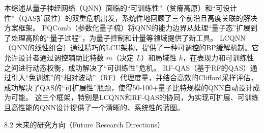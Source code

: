 \documentclass[12pt,a4paper]{article}
\begin{document}
本综述从量子神经网络（QNN）面临的“可训练性”（贫瘠高原）和“可设计性”（QAS扩展性）的双重危机出发，系统性地回顾了三个前沿且高度关联的解决方案框架。
PQComb（参数化量子梳）将QNN的能力边界从处理“量子态”扩展到了处理高阶的“量子过程”，为量子控制和计量等领域提供了新工具。
LCQNN（QNN的线性组合）通过精巧的LCU架构，提供了一种可调控的BP缓解机制。它允许设计者通过调控辅助比特数 $m$（决定 $L$）和局域性 $k$，在表现力和可训练性之间进行动态权衡，成功解决了“可训练性”危机。
RF-QAS（基于RF的QAS）通过引入“免训练”的“相对波动”（RF）代理度量，并结合高效的Clifford采样评估，成功解决了QAS的“可扩展性”瓶颈，使得50-100+量子比特规模的QNN自动设计成为可能。
这三个框架，特别是LCQNN和RF-QAS的协同，为实现可扩展、可训练且高性能的QNN设计提供了一个清晰的、系统性的蓝图。

8.2 未来的研究方向（Future Research Directions）
\end{document}
